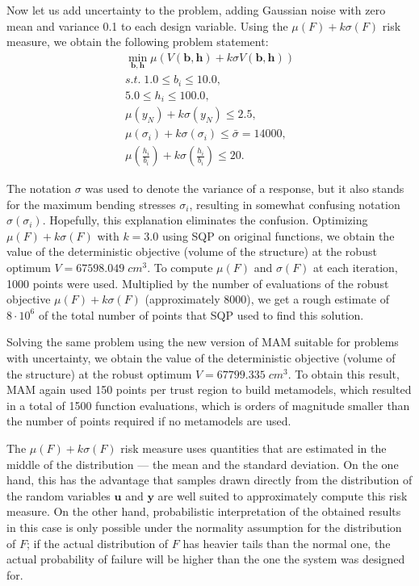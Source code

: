 \documentclass{llncs}
\begin{document}
Now let us add uncertainty to the problem, adding Gaussian noise with zero mean and variance 0.1 to each design variable. Using the $\mu(F) + k\sigma(F)$ risk measure, we obtain the following problem statement:
\begin{displaymath}
  \begin{array}{c}
    \min\limits_{\pmb b, \pmb h}\mu(V(\pmb b, \pmb h) + k\sigma V(\pmb b, \pmb h)) \\
    s.t.\;1.0\le b_i \le 10.0, \\
    5.0 \le h_i \le 100.0, \\
    \mu(y_N) + k\sigma(y_N)\le 2.5, \\
    \mu(\sigma_i)+k\sigma(\sigma_i)\le \bar{\sigma}=14000, \\
    \mu(\frac{h_i}{b_i})+k\sigma(\frac{h_i}{b_i})\le 20.
  \end{array}
\end{displaymath}

The notation $\sigma$ was used to denote the variance of a response, but it also stands for the maximum bending stresses $\sigma_i$, resulting in somewhat confusing notation $\sigma(\sigma_i )$. Hopefully, this explanation eliminates the confusion. Optimizing $\mu(F) + k\sigma(F)$ with $k = 3.0$ using SQP on original functions, we obtain the value of the deterministic objective (volume of the structure) at the robust optimum $V = 67598.049\; cm^3$. To compute $\mu(F)$ and $\sigma(F)$ at each iteration, 1000 points were used. Multiplied by the number of evaluations of the robust objective $\mu(F) + k\sigma(F)$ (approximately 8000), we get a rough estimate of $8\cdot 10^6$ of the total number of points that SQP used to find this solution.

Solving the same problem using the new version of MAM suitable for problems with uncertainty, we obtain the value of the deterministic objective (volume of the structure) at the robust optimum $V = 67799.335\; cm^3$. To obtain this result, MAM again used 150 points per trust region to build metamodels, which resulted in a total of 1500 function evaluations, which is orders of magnitude smaller than the number of points required if no metamodels are used.

The $\mu(F ) + k\sigma(F)$ risk measure uses quantities that are estimated in the middle of the distribution --- the mean and the standard deviation. On the one hand, this has the advantage that samples drawn directly from the distribution of the random variables $\pmb u$ and $\pmb y$ are well suited to approximately compute this risk measure. On the other hand, probabilistic interpretation of the obtained results in this case is only possible under the normality assumption for the distribution of $F$; if the actual distribution of $F$ has heavier tails than the normal one, the actual probability of failure will be higher than the one  the system was designed for.
\end{document}
